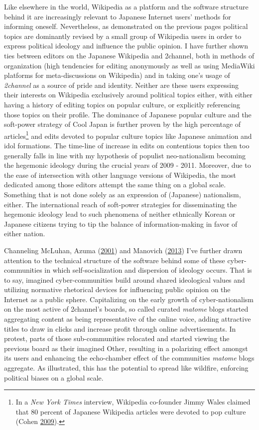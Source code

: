 \documentclass[10pt,british,A4paper,,openany]{memoir}
\begin{document}
Like elsewhere in the world, Wikipedia as a platform and the software
structure behind it are increasingly relevant to Japanese Internet
users' methods for informing oneself. Nevertheless, as demonstrated on
the previous pages political topics are dominantly revised by a small
group of Wikipedia users in order to express political ideology and
influence the public opinion. I have further shown ties between editors
on the Japanese Wikipedia and 2channel, both in methods of organization
(high tendencies for editing anonymously as well as using MediaWiki
platforms for meta-discussions on Wikipedia) and in taking one's usage
of \emph{2channel} as a source of pride and identity. Neither are these
users expressing their interests on Wikipedia exclusively around
political topics either, with either having a history of editing topics
on popular culture, or explicitly referencing those topics on their
profile. The dominance of Japanese popular culture and the soft-power
strategy of Cool Japan is further proven by the high percentage of
articles\footnote{In a \emph{New York Times} interview, Wikipedia
  co-founder Jimmy Wales claimed that 80 percent of Japanese Wikipedia
  articles were devoted to pop culture (Cohen
  \protect\hyperlink{ref-cohen_wikipedia_2009}{2009}).} and edits
devoted to popular culture topics like Japanese animation and idol
formations. The time-line of increase in edits on contentious topics
then too generally falls in line with my hypothesis of populist
neo-nationalism becoming the hegemonic ideology during the crucial years
of 2009 - 2011. Moreover, due to the ease of intersection with other
language versions of Wikipedia, the most dedicated among those editors
attempt the same thing on a global scale. Something that is not done
solely as an expression of (Japanese) nationalism, either. The
international reach of soft-power strategies for disseminating the
hegemonic ideology lead to such phenomena of neither ethnically Korean
or Japanese citizens trying to tip the balance of information-making in
favor of either nation.

Channeling McLuhan, Azuma
(\protect\hyperlink{ref-azuma_otaku:_2001}{2001}) and Manovich
(\protect\hyperlink{ref-manovich_software_2013}{2013}) I've further
drawn attention to the technical structure of the software behind some
of these cyber-communities in which self-socialization and dispersion of
ideology occurs. That is to say, imagined cyber-communities build around
shared ideological values and utilizing normative rhetorical devices for
influencing public opinion on the Internet as a public sphere.
Capitalizing on the early growth of cyber-nationalism on the most active
of 2channel's boards, so called curated \emph{matome} blogs started
aggregating content as being representative of the online voice, adding
attractive titles to draw in clicks and increase profit through online
advertisements. In protest, parts of those sub-communities relocated and
started viewing the previous board as their imagined Other, resulting in
a polarizing effect amongst its users and enhancing the echo-chamber
effect of the communities \emph{matome} blogs aggregate. As illustrated,
this has the potential to spread like wildfire, enforcing political
biases on a global scale.
\end{document}
